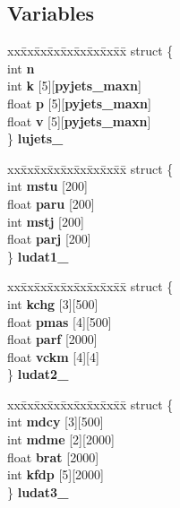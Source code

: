 \subsection*{Variables}
\begin{CompactItemize}
\item 
\begin{tabbing}
xx\=xx\=xx\=xx\=xx\=xx\=xx\=xx\=xx\=\kill
struct \{\\
\>int {\bf n}\\
\>int {\bf k} [5][{\bf pyjets\_maxn}]\\
\>float {\bf p} [5][{\bf pyjets\_maxn}]\\
\>float {\bf v} [5][{\bf pyjets\_maxn}]\\
\} {\bf lujets\_}\\

\end{tabbing}\item 
\begin{tabbing}
xx\=xx\=xx\=xx\=xx\=xx\=xx\=xx\=xx\=\kill
struct \{\\
\>int {\bf mstu} [200]\\
\>float {\bf paru} [200]\\
\>int {\bf mstj} [200]\\
\>float {\bf parj} [200]\\
\} {\bf ludat1\_}\\

\end{tabbing}\item 
\begin{tabbing}
xx\=xx\=xx\=xx\=xx\=xx\=xx\=xx\=xx\=\kill
struct \{\\
\>int {\bf kchg} [3][500]\\
\>float {\bf pmas} [4][500]\\
\>float {\bf parf} [2000]\\
\>float {\bf vckm} [4][4]\\
\} {\bf ludat2\_}\\

\end{tabbing}\item 
\begin{tabbing}
xx\=xx\=xx\=xx\=xx\=xx\=xx\=xx\=xx\=\kill
struct \{\\
\>int {\bf mdcy} [3][500]\\
\>int {\bf mdme} [2][2000]\\
\>float {\bf brat} [2000]\\
\>int {\bf kfdp} [5][2000]\\
\} {\bf ludat3\_}\\


\end{tabbing}
\end{CompactItemize}
